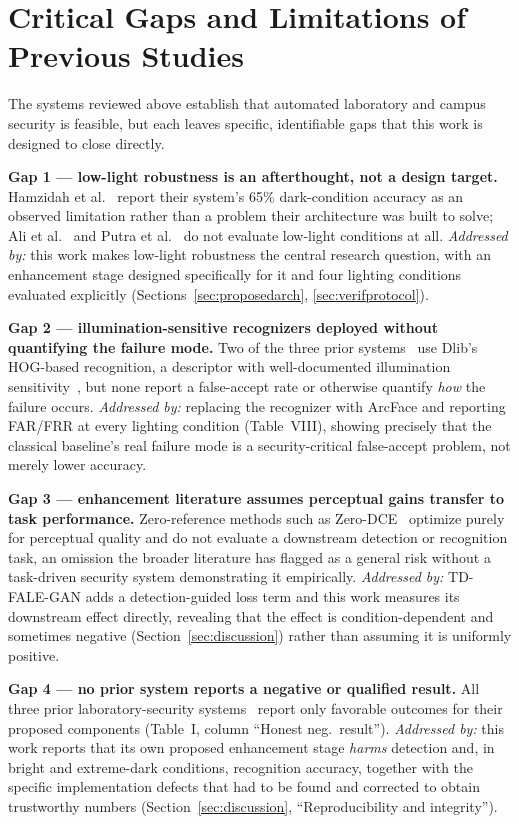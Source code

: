\documentclass[conference]{IEEEtran}
\begin{document}
\section{Critical Gaps and Limitations of Previous Studies}
\label{sec:gaps}
The systems reviewed above establish that automated laboratory
and campus security is feasible, but each leaves specific,
identifiable gaps that this work is designed to close directly.

\textbf{Gap 1 --- low-light robustness is an afterthought, not a
design target.} Hamzidah et al.~\cite{hamzidah2026} report their
system's 65\% dark-condition accuracy as an observed limitation
rather than a problem their architecture was built to solve; Ali
et al.~\cite{ali2022} and Putra et al.~\cite{putra2023} do not
evaluate low-light conditions at all. \textit{Addressed by:} this
work makes low-light robustness the central research question,
with an enhancement stage designed specifically for it and four
lighting conditions evaluated explicitly (Sections~\ref{sec:proposedarch},
\ref{sec:verifprotocol}).

\textbf{Gap 2 --- illumination-sensitive recognizers deployed
without quantifying the failure mode.} Two of the three prior
systems~\cite{hamzidah2026,putra2023} use Dlib's HOG-based
recognition, a descriptor with well-documented illumination
sensitivity~\cite{dalal2005}, but none report a false-accept rate
or otherwise quantify \textit{how} the failure occurs.
\textit{Addressed by:} replacing the recognizer with ArcFace and
reporting FAR/FRR at every lighting condition (Table~VIII),
showing precisely that the classical baseline's real failure mode
is a security-critical false-accept problem, not merely lower
accuracy.

\textbf{Gap 3 --- enhancement literature assumes perceptual gains
transfer to task performance.} Zero-reference methods such as
Zero-DCE~\cite{zerodce} optimize purely for perceptual quality and
do not evaluate a downstream detection or recognition task, an
omission the broader literature has flagged as a general risk
\cite{lowlightsurvey} without a task-driven security system
demonstrating it empirically. \textit{Addressed by:} TD-FALE-GAN
adds a detection-guided loss term and this work measures its
downstream effect directly, revealing that the effect is
condition-dependent and sometimes negative
(Section~\ref{sec:discussion}) rather
than assuming it is uniformly positive.

\textbf{Gap 4 --- no prior system reports a negative or
qualified result.} All three prior laboratory-security
systems~\cite{hamzidah2026,ali2022,putra2023} report only
favorable outcomes for their proposed components (Table~I,
column ``Honest neg.\ result''). \textit{Addressed by:} this work
reports that its own proposed enhancement stage \textit{harms}
detection and, in bright and extreme-dark conditions, recognition
accuracy, together with the specific implementation defects that
had to be found and corrected to obtain trustworthy numbers
(Section~\ref{sec:discussion}, ``Reproducibility and integrity'').
\end{document}
